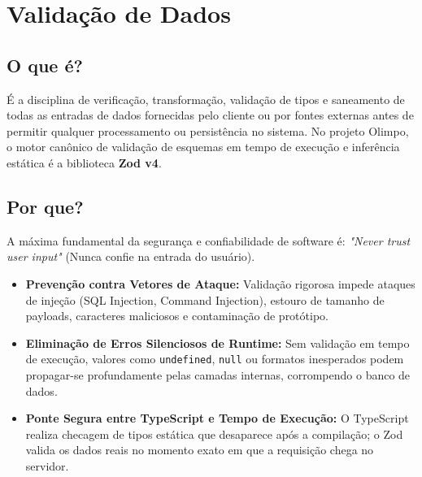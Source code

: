 \documentclass[12pt,a4paper]{article}
\begin{document}
\section{Validação de Dados}

\subsection{O que é?}
É a disciplina de verificação, transformação, validação de tipos e saneamento de todas as entradas de dados fornecidas pelo cliente ou por fontes externas antes de permitir qualquer processamento ou persistência no sistema. No projeto Olimpo, o motor canônico de validação de esquemas em tempo de execução e inferência estática é a biblioteca \textbf{Zod v4}.

\subsection{Por que?}
A máxima fundamental da segurança e confiabilidade de software é: \textit{"Never trust user input"} (Nunca confie na entrada do usuário).
\begin{itemize}
  \item \textbf{Prevenção contra Vetores de Ataque:} Validação rigorosa impede ataques de injeção (SQL Injection, Command Injection), estouro de tamanho de payloads, caracteres maliciosos e contaminação de protótipo.
  \item \textbf{Eliminação de Erros Silenciosos de Runtime:} Sem validação em tempo de execução, valores como \texttt{undefined}, \texttt{null} ou formatos inesperados podem propagar-se profundamente pelas camadas internas, corrompendo o banco de dados.
  \item \textbf{Ponte Segura entre TypeScript e Tempo de Execução:} O TypeScript realiza checagem de tipos estática que desaparece após a compilação; o Zod valida os dados reais no momento exato em que a requisição chega no servidor.
\end{itemize}
\end{document}
